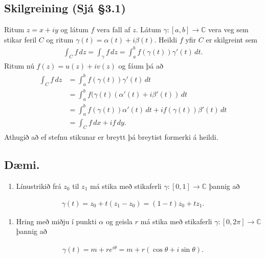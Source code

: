 \documentclass[a4paper,10pt,icelandic]{sphinxmanual}
\begin{document}
\subsection{Skilgreining (Sjá \S{}3.1)}
\label{\detokenize{Kafli03:skilgreining-sja-3-1}}
Ritum \(z=x+iy\) og látum \(f\) vera fall af \(z\). Látum \(\gamma: [a,b]\rightarrow {\mathbb{C}}\) vera veg sem stikar feril \(C\) og ritum
\(\gamma(t)=\alpha(t)+i\beta(t)\). Heildi \(f\) yfir \(C\) er skilgreint sem
\begin{equation*}
\begin{split}\int_C f\,dz=\int_\gamma f\,dz=\int_a^b f(\gamma(t))\gamma'(t)\,dt.\end{split}
\end{equation*}
Ritum nú \(f(z)=u(z)+iv(z)\) og fáum þá að
\begin{equation*}
\begin{split}\begin{aligned}
\int_C f\,dz&=\int_a^b f(\gamma(t))\gamma'(t)\,dt\\
&=\int_a^b f(\gamma(t)(\alpha'(t)+i\beta'(t))\,dt\\
&=\int_a^b f(\gamma(t))\alpha'(t)\,dt
+if(\gamma(t))\beta'(t)\,dt\\
&= \int_C f\,dx+if\,dy.\end{aligned}\end{split}
\end{equation*}
Athugið að ef stefnu stikunar er breytt þá breytist formerki á heildi.


\subsection{Dæmi.}
\label{\detokenize{Kafli03:daemi}}\begin{enumerate}
%
\item {} 
Línustrikið frá \(z_0\) til \(z_1\) má stika með stikaferli \(\gamma:[0,1]\rightarrow {\mathbb{C}}\) þannig að

\end{enumerate}
\begin{equation*}
\begin{split}\gamma(t)=z_0+t(z_1-z_0)=(1-t)z_0+tz_1.\end{split}
\end{equation*}\begin{enumerate}
%
\setcounter{enumi}{1}
\item {} 
Hring með miðju í punkti \(\alpha\) og geisla \(r\) má stika með stikaferli \(\gamma:[0,2\pi]\rightarrow {\mathbb{C}}\) þannig að

\end{enumerate}
\begin{equation*}
\begin{split}\gamma(t)=m+re^{i\theta}=m+r(\cos\theta+i\sin\theta).\end{split}
\end{equation*}
\end{document}
